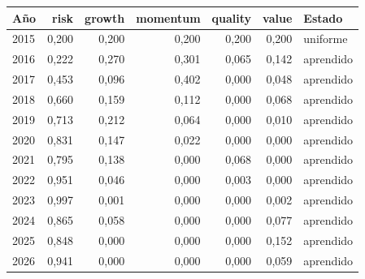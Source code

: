 \begin{tabular}{lrrrrrl}
\toprule
Año & risk & growth & momentum & quality & value & Estado \\
\midrule
2015 & 0,200 & 0,200 & 0,200 & 0,200 & 0,200 & uniforme \\
2016 & 0,222 & 0,270 & 0,301 & 0,065 & 0,142 & aprendido \\
2017 & 0,453 & 0,096 & 0,402 & 0,000 & 0,048 & aprendido \\
2018 & 0,660 & 0,159 & 0,112 & 0,000 & 0,068 & aprendido \\
2019 & 0,713 & 0,212 & 0,064 & 0,000 & 0,010 & aprendido \\
2020 & 0,831 & 0,147 & 0,022 & 0,000 & 0,000 & aprendido \\
2021 & 0,795 & 0,138 & 0,000 & 0,068 & 0,000 & aprendido \\
2022 & 0,951 & 0,046 & 0,000 & 0,003 & 0,000 & aprendido \\
2023 & 0,997 & 0,001 & 0,000 & 0,000 & 0,002 & aprendido \\
2024 & 0,865 & 0,058 & 0,000 & 0,000 & 0,077 & aprendido \\
2025 & 0,848 & 0,000 & 0,000 & 0,000 & 0,152 & aprendido \\
2026 & 0,941 & 0,000 & 0,000 & 0,000 & 0,059 & aprendido \\
\bottomrule
\end{tabular}
